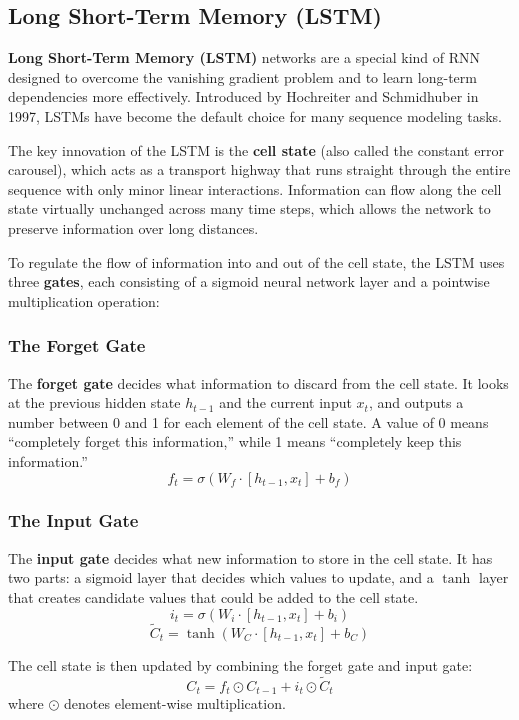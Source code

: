 \documentclass[11pt,a4paper]{article}
\begin{document}
\subsection{Long Short-Term Memory (LSTM)}

\textbf{Long Short-Term Memory (LSTM)} networks are a special kind of RNN designed to overcome the vanishing gradient problem and to learn long-term dependencies more effectively. Introduced by Hochreiter and Schmidhuber in 1997, LSTMs have become the default choice for many sequence modeling tasks.

The key innovation of the LSTM is the \textbf{cell state} (also called the constant error carousel), which acts as a transport highway that runs straight through the entire sequence with only minor linear interactions. Information can flow along the cell state virtually unchanged across many time steps, which allows the network to preserve information over long distances.

To regulate the flow of information into and out of the cell state, the LSTM uses three \textbf{gates}, each consisting of a sigmoid neural network layer and a pointwise multiplication operation:

\subsubsection{The Forget Gate}

The \textbf{forget gate} decides what information to discard from the cell state. It looks at the previous hidden state $h_{t-1}$ and the current input $x_t$, and outputs a number between 0 and 1 for each element of the cell state. A value of 0 means ``completely forget this information,'' while 1 means ``completely keep this information.''
\[
f_t = \sigma(W_f \cdot [h_{t-1}, x_t] + b_f)
\]

\subsubsection{The Input Gate}

The \textbf{input gate} decides what new information to store in the cell state. It has two parts: a sigmoid layer that decides which values to update, and a $\tanh$ layer that creates candidate values that could be added to the cell state.
\[
i_t = \sigma(W_i \cdot [h_{t-1}, x_t] + b_i)
\]
\[
\tilde{C}_t = \tanh(W_C \cdot [h_{t-1}, x_t] + b_C)
\]

The cell state is then updated by combining the forget gate and input gate:
\[
C_t = f_t \odot C_{t-1} + i_t \odot \tilde{C}_t
\]
where $\odot$ denotes element-wise multiplication.
\end{document}
